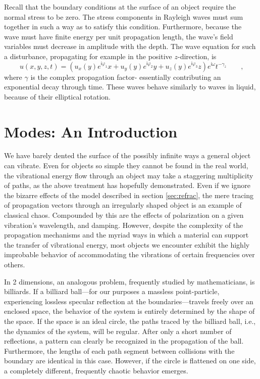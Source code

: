 \documentclass[a4paper,10pt]{report}
\numberwithin{equation}{section}
\begin{document}
Recall that the boundary conditions at the surface of an object require the normal stress to be zero. The stress components in Rayleigh waves must sum together in such a way as to satisfy this condition. Furthermore, because the wave must have finite energy per unit propagation length, the wave's field variables must decrease in amplitude with the depth. \cite[p.~110]{Kino1987} The wave equation for such a disturbance, propagating for example in the positive $z$-direction, is \cite[p.~70]{Ballantine1997}
\begin{equation}\label{saw}
u(x,y,z,t) = (u_x(y)e^{\mathsf{i}\varphi_1}x + u_y(y)e^{\mathsf{i}\varphi_2}y + u_z(y)e^{\mathsf{i}\varphi_3}z)e^{\mathsf{i}\omega}t^{-\gamma_z} \qquad \text{,}
\end{equation}
where $\gamma$ is the complex propagation factor- essentially contributing an exponential decay through time. \cite[p.112]{Kino1987} These waves behave similarly to waves in liquid, because of their elliptical rotation.

\section{Modes: An Introduction}\label{sec:modes}
 We have barely dented the surface of the possibly infinite ways a general object can vibrate. Even for objects so simple they cannot be found in the real world, the vibrational energy flow through an object may take a staggering multiplicity of paths, as the above treatment has hopefully demonstrated. Even if we ignore the bizarre effects of the model described in section \ref{sec:refrac}, the mere tracing of propagation vectors through an irregularly shaped object is an example of classical chaos. Compounded by this are the effects of polarization on a given vibration's wavelength, and damping. However, despite the complexity of the propagation mechanisms and the myriad ways in which a material can support the transfer of vibrational energy, most objects we encounter exhibit the highly improbable behavior of accommodating the vibrations of certain frequencies over others. 

In 2 dimensions, an analogous problem, frequently studied by mathematicians, is billiards. If a billiard ball---for our purposes a massless point-particle, experiencing lossless specular reflection at the boundaries---travels freely over an enclosed space, the behavior of the system is entirely determined by the shape of the space. If the space is an ideal circle, the paths traced by the billiard ball, i.e., the dynamics of the system, will be regular. After only a short number of reflections, a pattern can clearly be recognized in the propagation of the ball. Furthermore, the lengths of each path segment between collisions with the boundary are identical in this case. However, if the circle is flattened on one side, a completely different, frequently chaotic behavior emerges. \cite{Backer2007}
\end{document}
